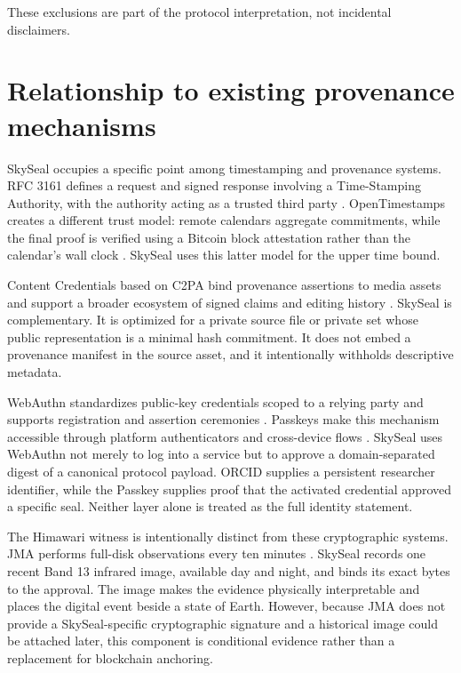\documentclass[11pt,a4paper]{article}
\begin{document}
These exclusions are part of the protocol interpretation, not incidental disclaimers.

\section{Relationship to existing provenance mechanisms}

SkySeal occupies a specific point among timestamping and provenance systems. RFC 3161 defines a request and signed response involving a Time-Stamping Authority, with the authority acting as a trusted third party \cite{rfc3161}. OpenTimestamps creates a different trust model: remote calendars aggregate commitments, while the final proof is verified using a Bitcoin block attestation rather than the calendar's wall clock \cite{ots2026,otsclient2026}. SkySeal uses this latter model for the upper time bound.

Content Credentials based on C2PA bind provenance assertions to media assets and support a broader ecosystem of signed claims and editing history \cite{c2pa2026}. SkySeal is complementary. It is optimized for a private source file or private set whose public representation is a minimal hash commitment. It does not embed a provenance manifest in the source asset, and it intentionally withholds descriptive metadata.

WebAuthn standardizes public-key credentials scoped to a relying party and supports registration and assertion ceremonies \cite{w3c2026}. Passkeys make this mechanism accessible through platform authenticators and cross-device flows \cite{fido2026}. SkySeal uses WebAuthn not merely to log into a service but to approve a domain-separated digest of a canonical protocol payload. ORCID supplies a persistent researcher identifier, while the Passkey supplies proof that the activated credential approved a specific seal. Neither layer alone is treated as the full identity statement.

The Himawari witness is intentionally distinct from these cryptographic systems. JMA performs full-disk observations every ten minutes \cite{jma2026}. SkySeal records one recent Band 13 infrared image, available day and night, and binds its exact bytes to the approval. The image makes the evidence physically interpretable and places the digital event beside a state of Earth. However, because JMA does not provide a SkySeal-specific cryptographic signature and a historical image could be attached later, this component is conditional evidence rather than a replacement for blockchain anchoring.
\end{document}
